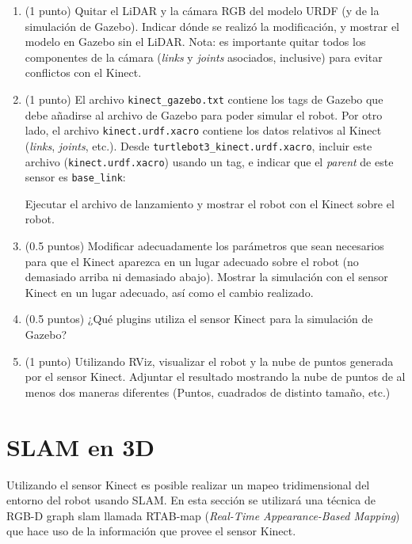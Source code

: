 \documentclass[a4paper,11pt]{robotlabs}
\begin{document}
\begin{enumerate}
\item (1 punto) Quitar el LiDAR y la cámara RGB del modelo URDF (y de la
  simulación de Gazebo). Indicar dónde se realizó la modificación, y mostrar el
  modelo en Gazebo sin el LiDAR. Nota: es importante quitar todos los
  componentes de la cámara (\textit{links} y \textit{joints} asociados,
  inclusive) para evitar conflictos con el Kinect.
  
\item (1 punto) El archivo \texttt{kinect\_gazebo.txt} contiene los tags de
  Gazebo que debe añadirse al archivo de Gazebo para poder simular el
  robot. Por otro lado, el archivo \texttt{kinect.urdf.xacro} contiene los
  datos relativos al Kinect (\textit{links}, \textit{joints}, etc.). Desde
  \texttt{turtlebot3\_kinect.urdf.xacro}, incluir este archivo
  (\texttt{kinect.urdf.xacro}) usando un tag, e indicar que el \textit{parent}
  de este sensor es \texttt{base\_link}: 
Ejecutar el archivo de lanzamiento y mostrar el robot con el Kinect sobre el
robot.

\item (0.5 puntos) Modificar adecuadamente los parámetros que sean necesarios
  para que el Kinect aparezca en un lugar adecuado sobre el robot (no demasiado
  arriba ni demasiado abajo). Mostrar la simulación con el sensor Kinect en un
  lugar adecuado, así como el cambio realizado.
  
\item (0.5 puntos) ¿Qué plugins utiliza el sensor Kinect para la simulación de
  Gazebo?

\item (1 punto) Utilizando RViz, visualizar el robot y la nube de puntos
  generada por el sensor Kinect. Adjuntar el resultado mostrando la nube de
  puntos de al menos dos maneras diferentes (Puntos, cuadrados de distinto
  tamaño, etc.)

  
\end{enumerate}


\section{SLAM en 3D}

Utilizando el sensor Kinect es posible realizar un mapeo tridimensional del
entorno del robot usando SLAM. En esta sección se utilizará una técnica de
RGB-D graph slam llamada RTAB-map (\textit{Real-Time Appearance-Based
  Mapping}) que hace uso de la información que provee el sensor Kinect.
\end{document}
